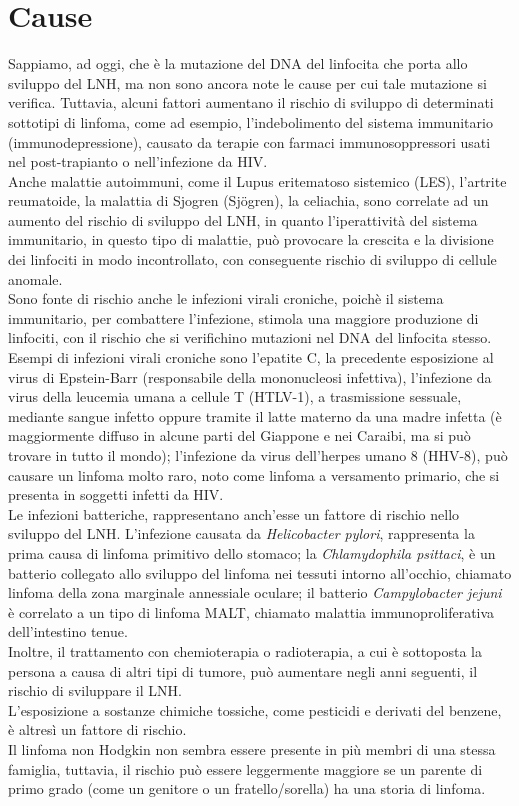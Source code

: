 \section{Cause}
Sappiamo, ad oggi, che è la mutazione del DNA del linfocita che porta allo sviluppo del LNH, 
ma non sono ancora note le cause per cui tale mutazione si verifica. 
Tuttavia, alcuni fattori aumentano il rischio di sviluppo di determinati sottotipi di linfoma, come ad esempio, 
l’indebolimento del sistema immunitario (immunodepressione), causato da terapie con farmaci 
immunosoppressori usati nel post-trapianto o nell'infezione da HIV\cite{AMERICANCS}.\\
Anche malattie autoimmuni, come il Lupus eritematoso sistemico (LES), l'artrite reumatoide, 
la malattia di Sjogren (Sjögren), la celiachia, sono correlate ad un aumento del rischio di sviluppo del LNH, 
in quanto l’iperattività del sistema immunitario, in questo tipo di malattie, può provocare la crescita e la 
divisione dei linfociti in modo incontrollato, 
con conseguente rischio di sviluppo di cellule anomale\cite{AMERICANCS}.\\
Sono fonte di rischio anche le infezioni virali croniche, poichè il sistema immunitario, 
per combattere l’infezione, stimola una maggiore produzione di linfociti, con il rischio che si 
verifichino mutazioni nel DNA del linfocita stesso. Esempi di infezioni virali croniche sono l’epatite C, 
la precedente esposizione al virus di Epstein-Barr (responsabile della mononucleosi infettiva), 
l'infezione da virus della leucemia umana a cellule T (HTLV-1), a trasmissione sessuale, mediante sangue infetto 
oppure tramite il latte materno da una madre infetta (è maggiormente diffuso in alcune parti del 
Giappone e nei Caraibi, ma si può trovare in tutto il mondo); l’infezione da virus dell'herpes umano 8 (HHV-8), 
può causare un linfoma molto raro, noto come linfoma a versamento primario, che si presenta in soggetti infetti da HIV.\\
Le infezioni batteriche, rappresentano anch’esse un fattore di rischio nello sviluppo del LNH. 
L’infezione causata da \emph{Helicobacter pylori}, rappresenta la prima causa di linfoma primitivo dello stomaco; 
la \emph{Chlamydophila psittaci}, è un batterio collegato allo sviluppo del linfoma nei tessuti intorno all’occhio, 
chiamato linfoma della zona marginale annessiale oculare; il batterio \emph{Campylobacter jejuni} è correlato a un tipo 
di linfoma MALT, chiamato malattia immunoproliferativa dell'intestino tenue\cite{AMERICANCS}.\\
Inoltre, il trattamento con chemioterapia o radioterapia, a cui è sottoposta la persona a causa di altri tipi di tumore, 
può aumentare negli anni seguenti, il rischio di sviluppare il LNH\cite{AMERICANCS}.\\
L’esposizione a sostanze chimiche tossiche, come pesticidi e derivati del benzene, è altresì un fattore di rischio.\\ 
Il linfoma non Hodgkin non sembra essere presente in più membri di una stessa famiglia, tuttavia, 
il rischio può essere leggermente maggiore se un parente di primo grado (come un genitore o un fratello/sorella) 
ha una storia di linfoma\cite{AMERICANCS}.


